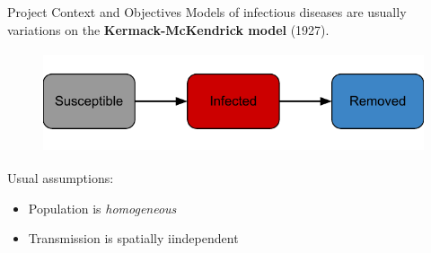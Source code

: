 \begin{slide}{Project Context and Objectives}
	Models of infectious diseases are usually variations on the \textbf{Kermack-McKendrick model} (1927).
	\begin{figure}
		\centering
		\includegraphics[height=3cm]{images/sir-idea}
	\end{figure}
	Usual assumptions:
	\begin{itemize}
		\item Population is \emph{homogeneous}
		\item Transmission is spatially iindependent
	\end{itemize}
\end{slide}